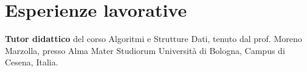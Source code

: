 \documentclass[curriculum-vitae-ita]{subfiles}
\begin{document}
	\section*{Esperienze lavorative}
	
	 \textbf{Tutor didattico} del corso Algoritmi e Strutture Dati, tenuto dal prof. Moreno Marzolla, presso Alma Mater Studiorum Università di Bologna, Campus di Cesena, Italia.
\end{document}
